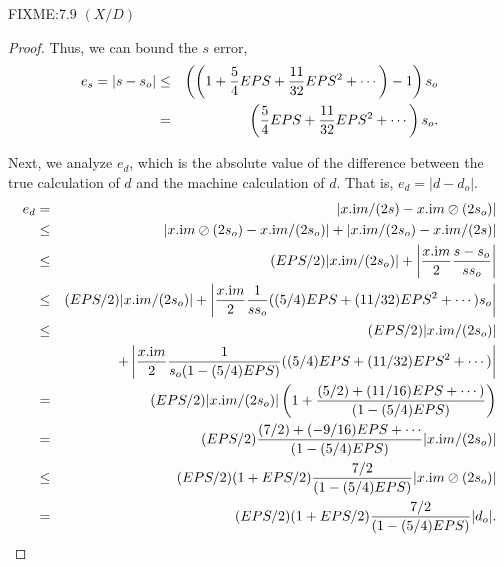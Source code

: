 \begin{definition}
\begin{proposition}{FIXME:7.9 $(X / D)$}
\begin{proof}{}
Thus, we can bound the $s$ error, 
\begin{eqnarray*}
e_s = |s - s_o|&\le&\left(\left(1 + {5 \over 4} EPS + {11 \over 32} EPS^2 +\cdots\right) - 1\right) s_o\\
&=& \left({5 \over 4} EPS +
{11 \over 32} EPS^2 +\cdots\right) s_o.
\end{eqnarray*}

Next, we analyze $e_d$, which is the absolute value of the difference between the true calculation of $d$ and the machine calculation of $d$.  That is, $e_d = |d - d_o|.$
\begin{eqnarray*}
e_d &=& |x.{\mathrm im}/(2s) - x.{\mathrm im} \oslash (2 s_o)|\\
&\le& |x.{\mathrm im} \oslash (2 s_o) - x.{\mathrm im} / (2 s_o)| + 
|x.{\mathrm im}/(2s_o) - x.{\mathrm im}/(2s) |\\
&\le& (EPS/2) |x.{\mathrm im} / (2 s_o)| + \left|{x.{\mathrm im} \over 2} {s - s_o \over s s_o} \right|\\
&\le& (EPS/2) |x .{\mathrm im}/ (2
s_o)| +\left|{x.{\mathrm im} \over 2} {1 \over s s_o} ((5/4)EPS + (11/32)EPS^2+\cdots) s_o\right|\\
&\le& (EPS/2) |x.{\mathrm im} / (2
s_o)| \\
&&+ \left|{x.{\mathrm im} \over 2} {1 \over s_o (1 - (5/4)EPS)}((5/4)EPS + (11/32)EPS^2+\cdots)\right|\\
&= &(EPS/2) |x .{\mathrm
im}/ (2 s_o)| \left(1 + {(5/2) + (11/16)EPS+\cdots) \over (1 - (5/4)EPS)}\right)\\
&= &(EPS/2) {(7/2) + (-9/16) EPS +\cdots\over
(1 - (5/4)EPS)} |x .{\mathrm im}/ (2 s_o)|\\
&\le& (EPS/2) (1+EPS/2)
 {7/2 \over (1 - (5/4)EPS)}
|x .{\mathrm im} \oslash (2 s_o)|\\
&= &(EPS/2) (1+EPS/2)
 {7/2 \over (1 - (5/4)EPS)}
|d_o|.
\end{eqnarray*}
 

\end{proof}
\end{proposition}
\end{definition}
